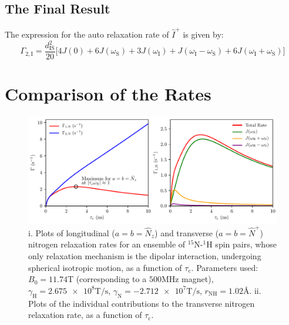 \begin{appendixtext}
\subsection{The Final Result} \label{subsecB.3.2}
The expression for the auto relaxation rate of $\hat{I}^+$ is given by:
\begin{equation}
\label{eqB.7}
\Gamma_{2,\text{I}} = \frac{d_{\text{IS}}^2 }{20} \big[4 J(0) + 6 J(\omega_{\text{S}}) + 3 J(\omega_{\text{I}}) + J(\omega_{\text{I}} - \omega_{\text{S}}) + 6 J(\omega_{\text{I}} + \omega_{\text{S}})\big]
\end{equation}
\section{Comparison of the Rates} \label{secB.4}
\begin{figure}
\centering
\includegraphics[scale=0.85]{./Figures/SimonsFigs/AppendixBFig.pdf}
\caption{i. Plots of longitudinal ($a = b = \hat{N}_z$) and transverse ($a = b = \hat{N}^+$) nitrogen relaxation rates for an ensemble of $^{15}$N-$^{1}$H spin pairs, whose only relaxation mechanism is the dipolar interaction, undergoing spherical isotropic motion, as a function of $\tau_{\text{c}}$. Parameters used: $B_0 = 11.74 \si{\tesla}$ (corresponding to a $500 \si{\mega \hertz}$ magnet), $\gamma_{\text{H}} = \num{2.675e8} \si{\tesla\per\second}$, $\gamma_{\text{N}} = \num{-2.712e7} \si{\tesla\per\second}$, $r_{\text{NH}} = \num{1.02} \si{\angstrom}$. ii. Plots of the individual contributions to the transverse nitrogen relaxation rate, as a function of $\tau_{\text{c}}$.}
\label{figB.1}
\end{figure}


\end{appendixtext}

